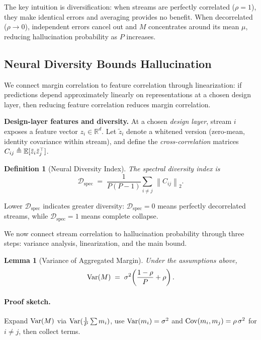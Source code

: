 \documentclass{article} %
\newtheorem{lemma}{Lemma}
\newtheorem{definition}{Definition}
\newcommand{\norm}[1]{\left\lVert #1 \right\rVert}
\begin{document}
The key intuition is diversification: when streams are perfectly correlated ($\rho = 1$), they make identical
errors and averaging provides no benefit. When decorrelated ($\rho \to 0$), independent errors cancel out and
$M$ concentrates around its mean $\mu$, reducing hallucination probability as $P$ increases.

\subsection{Neural Diversity Bounds Hallucination}
We connect margin correlation to feature correlation through linearization: if predictions depend approximately
linearly on representations at a chosen design layer, then reducing feature correlation reduces margin correlation.

\textbf{Design-layer features and diversity.}
At a chosen \emph{design layer}, stream $i$ exposes a feature vector $z_i\in\mathbb{R}^d$. Let $\tilde z_i$
denote a whitened version (zero-mean, identity covariance within stream), and define the
\emph{cross-correlation} matrices $C_{ij}\triangleq \mathbb{E}[\tilde z_i \tilde z_j^\top]$.

\begin{definition}[Neural Diversity Index]
  \label{def:diversity}
  The spectral diversity index is
  \begin{equation}
    \mathcal{D}_{\mathrm{spec}}
    \;=\; \frac{1}{P(P-1)}\sum_{i\ne j}\,\norm{C_{ij}}_2.
  \end{equation}
\end{definition}

Lower $\mathcal{D}_{\mathrm{spec}}$ indicates greater diversity: $\mathcal{D}_{\mathrm{spec}} = 0$ means perfectly
decorrelated streams, while $\mathcal{D}_{\mathrm{spec}} = 1$ means complete collapse.

We now connect stream correlation to hallucination probability through three steps: variance analysis,
linearization, and the main bound.

\begin{lemma}[Variance of Aggregated Margin]
  \label{lem:var-aggregate}
  Under the assumptions above,
  \begin{equation}
    \mathrm{Var}(M) \;=\; \sigma^2\!\left(\frac{1-\rho}{P}+\rho\right).
  \end{equation}
\end{lemma}

\paragraph{Proof sketch.}
Expand $\mathrm{Var}(M)$ via $\mathrm{Var}(\frac1P\sum m_i)$, use $\mathrm{Var}(m_i)=\sigma^2$ and $\mathrm{Cov}(m_i,m_j)=\rho\,\sigma^2$ for
$i\neq j$, then collect terms.
\end{document}

